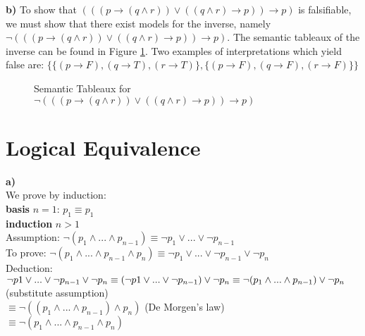 \documentclass[]{article}
\begin{document}
\noindent \textbf{b)} To show that $(((p \rightarrow (q \wedge r)) \lor ((q \wedge r) \rightarrow p))\rightarrow p)$ is falsifiable, we must show that there exist models for the inverse, namely $\neg (((p \rightarrow (q \wedge r)) \lor ((q \wedge r) \rightarrow p))\rightarrow p)$. The semantic tableaux of the inverse can be found in Figure \ref{fig:both}. Two examples of interpretations which yield false are: $\{\{(p\rightarrow F), (q\rightarrow T), (r\rightarrow T)\},\{(p\rightarrow F),(q\rightarrow F),(r\rightarrow F)\}\}$


\begin{figure}[h]
\centering
{}
\caption{Semantic Tableaux for $\neg (((p \rightarrow (q \wedge r)) \lor ((q \wedge r) \rightarrow p))\rightarrow p)$} \label{fig:both}
\end{figure}

\section{Logical Equivalence}

\textbf{a)} \\
We prove by induction: \\
\textbf{basis} $n = 1$: $p_1 \equiv p_1$\\
\textbf{induction} $n > 1$ \\
Assumption: $\neg (p_1 \wedge ...\wedge p_{n-1}) \equiv \neg p_1 \vee ... \vee \neg p_{n-1}$\\
To prove: $\neg (p_1 \wedge ...\wedge p_{n-1} \wedge p_n) \equiv \neg p_1 \vee ... \vee \neg p_{n-1} \vee \neg p_n$\\
Deduction: \\
$\neg p1 \vee ... \vee \neg p_{n-1} \vee \neg p_n \\
\equiv (\neg p1 \vee ... \vee \neg p_{n-1}) \vee \neg p_n \\
\equiv \neg (p_1 \wedge ... \wedge p_{n-1}) \vee \neg p_n$   (substitute assumption) \\$
\equiv \neg ((p_1 \wedge ... \wedge p_{n-1}) \wedge p_n)$ (De Morgen's law) \\ $
\equiv \neg (p_1 \wedge ... \wedge p_{n-1} \wedge p_n)$ \\ \\
\end{document}
